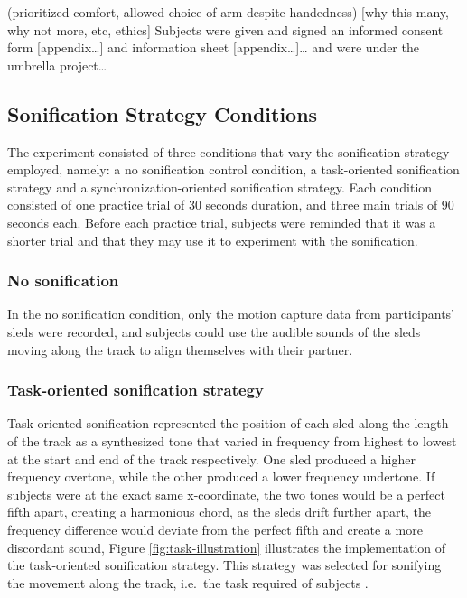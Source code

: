 \documentclass[10pt,a4paper,onecolumn]{article}
\begin{document}
(prioritized comfort, allowed choice of arm despite handedness) {[}why this many, why not more, etc, ethics{]} Subjects were given and signed an informed consent form {[}appendix\ldots{]} and information sheet {[}appendix\ldots{]}\ldots{} and were under the umbrella project\ldots{}

\hypertarget{sonification-strategy-conditions}{%
\subsection{Sonification Strategy Conditions}\label{sonification-strategy-conditions}}

The experiment consisted of three conditions that vary the sonification strategy employed, namely: a no sonification control condition, a task-oriented sonification strategy and a synchronization-oriented sonification strategy. Each condition consisted of one practice trial of 30 seconds duration, and three main trials of 90 seconds each. Before each practice trial, subjects were reminded that it was a shorter trial and that they may use it to experiment with the sonification.

\hypertarget{no-sonification}{%
\subsubsection{No sonification}\label{no-sonification}}

In the no sonification condition, only the motion capture data from participants' sleds were recorded, and subjects could use the audible sounds of the sleds moving along the track to align themselves with their partner.

\hypertarget{task-oriented-sonification-strategy}{%
\subsubsection{Task-oriented sonification strategy}\label{task-oriented-sonification-strategy}}

Task oriented sonification represented the position of each sled along the length of the track as a synthesized tone that varied in frequency from highest to lowest at the start and end of the track respectively. One sled produced a higher frequency overtone, while the other produced a lower frequency undertone. If subjects were at the exact same x-coordinate, the two tones would be a perfect fifth apart, creating a harmonious chord, as the sleds drift further apart, the frequency difference would deviate from the perfect fifth and create a more discordant sound, Figure \ref{fig:task-illustration} illustrates the implementation of the task-oriented sonification strategy. This strategy was selected for sonifying the movement along the track, i.e.~the task required of subjects .
\end{document}
